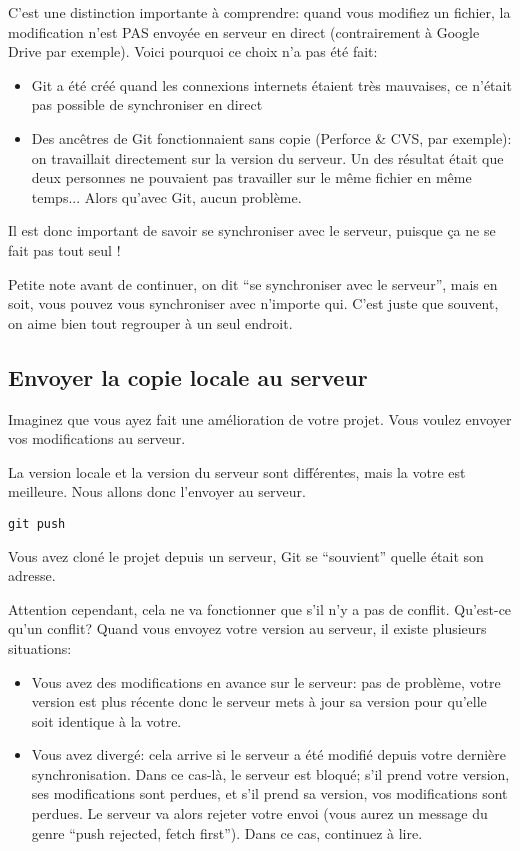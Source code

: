 \documentclass[10pt,a4paper]{article}
\begin{document}
C'est une distinction importante à comprendre: quand vous modifiez un fichier, la modification n'est PAS envoyée en serveur en direct (contrairement à Google Drive par exemple). Voici pourquoi ce choix n'a pas été fait:

\begin{itemize}
\item Git a été créé quand les connexions internets étaient très mauvaises, ce n'était pas possible de synchroniser en direct
\item Des ancêtres de Git fonctionnaient sans copie (Perforce \& CVS, par exemple): on travaillait directement sur la version du serveur. Un des résultat était que deux personnes ne pouvaient pas travailler sur le même fichier en même temps... Alors qu'avec Git, aucun problème.
\end{itemize}

Il est donc important de savoir se synchroniser avec le serveur, puisque ça ne se fait pas tout seul !

Petite note avant de continuer, on dit ``se synchroniser avec le serveur'', mais en soit, vous pouvez vous synchroniser avec n'importe qui. C'est juste que souvent, on aime bien tout regrouper à un seul endroit.

\subsection{Envoyer la copie locale au serveur}

Imaginez que vous ayez fait une amélioration de votre projet. Vous voulez envoyer vos modifications au serveur.

La version locale et la version du serveur sont différentes, mais la votre est meilleure.
Nous allons donc l'envoyer au serveur.

\begin{verbatim}
git push
\end{verbatim}

Vous avez cloné le projet depuis un serveur, Git se ``souvient'' quelle était son adresse.

Attention cependant, cela ne va fonctionner que s'il n'y a pas de conflit. Qu'est-ce qu'un conflit? Quand vous envoyez votre version au serveur, il existe plusieurs situations:

\begin{itemize}
\item Vous avez des modifications en avance sur le serveur: pas de problème, votre version est plus récente donc le serveur mets à jour sa version pour qu'elle soit identique à la votre.
\item Vous avez divergé: cela arrive si le serveur a été modifié depuis votre dernière synchronisation. Dans ce cas-là, le serveur est bloqué; s'il prend votre version, ses modifications sont perdues, et s'il prend sa version, vos modifications sont perdues. Le serveur va alors rejeter votre envoi (vous aurez un message du genre ``push rejected, fetch first''). Dans ce cas, continuez à lire.
\end{itemize}
\end{document}
